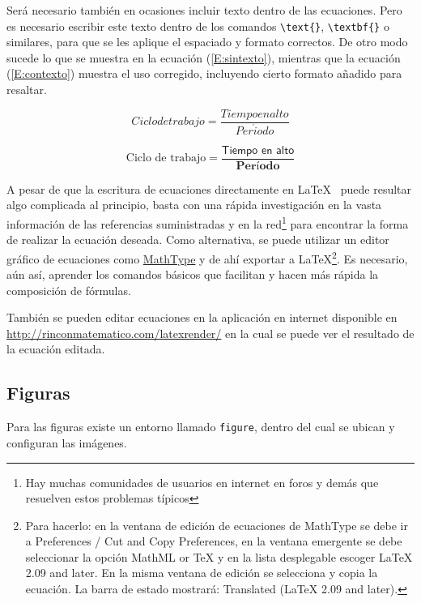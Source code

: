 Será necesario también en ocasiones incluir texto dentro de las ecuaciones. Pero es necesario escribir este texto dentro de los comandos \verb+\text{}+, \verb+\textbf{}+ o similares, para que se les aplique el espaciado y formato correctos. De otro modo sucede lo que se muestra en la ecuación (\ref{E:sintexto}), mientras que la ecuación (\ref{E:contexto}) muestra el uso corregido, incluyendo cierto formato añadido para resaltar.

\begin{equation}\label{E:sintexto}
Ciclo de trabajo = \frac{Tiempo en alto}{Per\acute{i}odo}
\end{equation}

\begin{equation}\label{E:contexto}
\text{Ciclo de trabajo} = \frac{\textsf{Tiempo en alto}}{\textbf{Per\'{i}odo}}
\end{equation}

A pesar de que la escritura de ecuaciones directamente en \LaTeX~ puede resultar algo complicada al principio, basta con una rápida investigación en la vasta información de las referencias suministradas y en la red\footnote{Hay muchas comunidades de usuarios en internet en foros y demás que resuelven estos problemas típicos} para encontrar la forma de realizar la ecuación deseada. Como alternativa, se puede utilizar un editor gráfico de ecuaciones como \href{http://www.dessci.com/en/products/mathtype/}{MathType} y de ahí exportar a \LaTeX\footnote{Para hacerlo: en la ventana de edición de ecuaciones de MathType se debe ir a \textsf{Preferences / Cut and Copy Preferences}, en la ventana emergente se debe seleccionar la opción \textsf{MathML or TeX} y en la lista desplegable escoger \textsf{LaTeX 2.09 and later}. En la misma ventana de edición se selecciona y copia la ecuación. La barra de estado mostrará: \textsf{Translated (LaTeX 2.09 and later)}.}. Es necesario, aún así, aprender los comandos básicos que facilitan y hacen más rápida la composición de fórmulas.

También se pueden editar ecuaciones en la aplicación en internet disponible en \url{http://rinconmatematico.com/latexrender/} en la cual se puede ver el resultado de la ecuación editada.

\subsection{Figuras}\label{S:Figuras}

Para las figuras existe un entorno llamado \verb+figure+, dentro del cual se ubican y configuran las imágenes.

